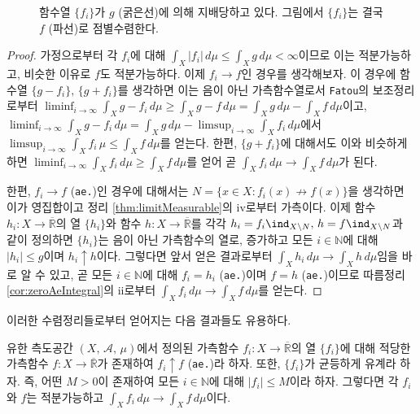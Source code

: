 \begin{figure}[!ht]
    \caption{함수열 $\{f_i\}$가 $g$ (굵은선)에 의해 지배당하고 있다. 그림에서 $\{f_i\}$는 결국 $f$ (파선)로 점별수렴한다.}
\end{figure}

\begin{proof}
    가정으로부터 각 $f_i$에 대해 $\int_X|f_i|\,d\mu\leq\int_Xg\,d\mu<\infty$이므로 이는 적분가능하고, 비슷한 이유로 $f$도 적분가능하다. 이제 $f_i\to f$인 경우를 생각해보자. 이 경우에 함수열 $\{g-f_i\},\,\{g+f_i\}$를 생각하면 이는 음이 아닌 가측함수열로서 \texttt{Fatou}의 보조정리로부터 $\liminf_{i\to\infty}\int_Xg-f_i\,d\mu\geq\int_Xg-f\,d\mu=\int_Xg\,d\mu-\int_Xf\,d\mu$이고, $\liminf_{i\to\infty}\int_Xg-f_i\,d\mu=\int_Xg\,d\mu-\limsup_{i\to\infty}\int_Xf_i\,d\mu$에서 $\limsup_{i\to\infty}\int_Xf_i\,\mu\leq\int_Xf\,d\mu$를 얻는다. 한편, $\{g+f_i\}$에 대해서도 이와 비슷하게 하면 $\liminf_{i\to\infty}\int_Xf_i\,d\mu\geq\int_Xf\,d\mu$를 얻어 곧 $\int_Xf_i\,d\mu\to\int_Xf\,d\mu$가 된다.

    한편, $f_i\to f$ (\texttt{ae.})인 경우에 대해서는 $N=\{x\in X:f_i(x)\not\to f(x)\}$을 생각하면 이가 영집합이고 정리 \ref{thm:limitMeasurable}의 iv로부터 가측이다. 이제 함수 $h_i:X\to\overline{\mathbb{R}}$의 열 $\{h_i\}$와 함수 $h:X\to\overline{\mathbb{R}}$를 각각 $h_i=f_i\ind_{X\setminus N},\,h=f\ind_{X\setminus N}$과 같이 정의하면 $\{h_i\}$는 음이 아닌 가측함수의 열로, 증가하고 모든 $i\in\mathbb{N}$에 대해 $|h_i|\leq g$이며 $h_i\uparrow h$이다. 그렇다면 앞서 얻은 결과로부터 $\int_Xh_i\,d\mu\to\int_Xh\,d\mu$임을 바로 알 수 있고, 곧 모든 $i\in\mathbb{N}$에 대해 $f_i=h_i$ (\texttt{ae.})이며 $f=h$ (\texttt{ae.})이므로 따름정리 \ref{cor:zeroAeIntegral}의 ii로부터 $\int_Xf_i\,d\mu\to\int_Xf\,d\mu$를 얻는다.
\end{proof}

이러한 수렴정리들로부터 얻어지는 다음 결과들도 유용하다.

\begin{corollary}
    유한 측도공간 $(X,\,\mathcal{A},\,\mu)$에서 정의된 가측함수 $f_i:X\to\overline{\mathbb{R}}$의 열 $\{f_i\}$에 대해 적당한 가측함수 $f:X\to\overline{\mathbb{R}}$가 존재하여  $f_i\uparrow f$ (\texttt{ae.})라 하자. 또한, $\{f_i\}$가 균등하게 유계라 하자. 즉, 어떤 $M>0$이 존재하여 모든 $i\in\mathbb{N}$에 대해 $|f_i|\leq M$이라 하자. 그렇다면 각 $f_i$와 $f$는 적분가능하고 $\int_Xf_i\,d\mu\to\int_Xf\,d\mu$이다.
\end{corollary}

